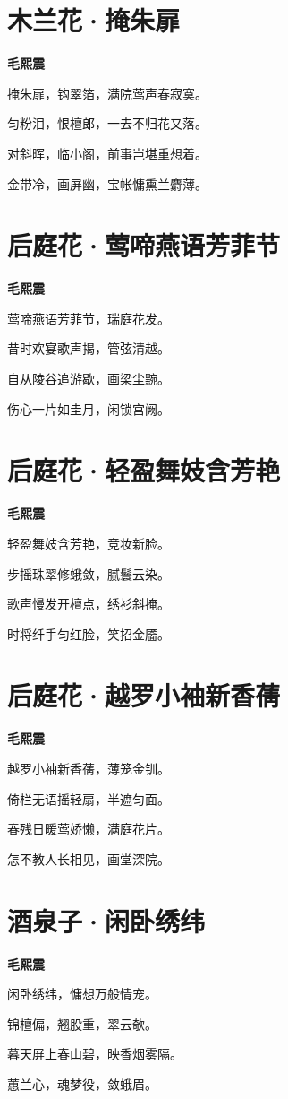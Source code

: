 \documentclass[12pt,a4paper]{ctexbook}
\begin{document}
\section{木兰花·掩朱扉}
\textbf{毛熙震}\par\vspace{0.5em}
掩朱扉，钩翠箔，满院莺声春寂寞。\par
匀粉泪，恨檀郎，一去不归花又落。\par
对斜晖，临小阁，前事岂堪重想着。\par
金带冷，画屏幽，宝帐慵熏兰麝薄。\par

\section{后庭花·莺啼燕语芳菲节}
\textbf{毛熙震}\par\vspace{0.5em}
莺啼燕语芳菲节，瑞庭花发。\par
昔时欢宴歌声揭，管弦清越。\par
自从陵谷追游歇，画梁尘黦。\par
伤心一片如圭月，闲锁宫阙。\par

\section{后庭花·轻盈舞妓含芳艳}
\textbf{毛熙震}\par\vspace{0.5em}
轻盈舞妓含芳艳，竞妆新脸。\par
步摇珠翠修蛾敛，腻鬟云染。\par
歌声慢发开檀点，绣衫斜掩。\par
时将纤手匀红脸，笑招金靥。\par

\section{后庭花·越罗小袖新香蒨}
\textbf{毛熙震}\par\vspace{0.5em}
越罗小袖新香蒨，薄笼金钏。\par
倚栏无语摇轻扇，半遮匀面。\par
春残日暖莺娇懒，满庭花片。\par
怎不教人长相见，画堂深院。\par

\section{酒泉子·闲卧绣纬}
\textbf{毛熙震}\par\vspace{0.5em}
闲卧绣纬，慵想万般情宠。\par
锦檀偏，翘股重，翠云欹。\par
暮天屏上春山碧，映香烟雾隔。\par
蕙兰心，魂梦役，敛蛾眉。\par
\end{document}
